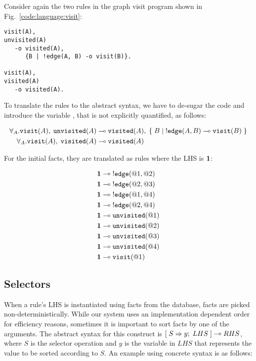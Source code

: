 Consider again the two rules in the graph visit program shown in
Fig.~\ref{code:language:visit}:

\nopagebreak

\begin{Verbatim}[fontsize=\codesize]
visit(A),
unvisited(A)
   -o visited(A),
      {B | !edge(A, B) -o visit(B)}.

visit(A),
visited(A)
   -o visited(A).
\end{Verbatim}

To translate the rules to the abstract syntax, we have to de-sugar the code and
introduce the variable , that is not explicitly quantified, as follows:

\nopagebreak

\begin{align}
\forall_A. \mathtt{visit}(A), \; \mathtt{unvisited}(A) \multimap & \;
\mathtt{visited}(A), \; \{ \; B \; | \; {!}\mathtt{edge}(A, B) \multimap \mathtt{visit}(B) \; \}\\
\forall_A. \mathtt{visit}(A), \; \mathtt{visited}(A) \multimap & \;
\mathtt{visited}(A)
\end{align}

For the initial facts, they are translated as rules where the LHS is $\mathbf{1}$:

\nopagebreak

\begin{align}
\mathbf{1} \multimap \; & {!} \mathtt{edge}(@1, @2) \\
\mathbf{1} \multimap \; & {!} \mathtt{edge}(@2, @3) \\
\mathbf{1} \multimap \; & {!} \mathtt{edge}(@1, @4) \\
\mathbf{1} \multimap \; & {!} \mathtt{edge}(@2, @4) \\
\mathbf{1} \multimap \; & \mathtt{unvisited}(@1)  \\
\mathbf{1} \multimap \; & \mathtt{unvisited}(@2) \\
\mathbf{1} \multimap \; & \mathtt{unvisited}(@3) \\
\mathbf{1} \multimap \; & \mathtt{unvisited}(@4) \\
\mathbf{1} \multimap \; & \mathtt{visit}(@1)
\end{align}

\subsection{Selectors}\label{section:language:selector}

When a rule's LHS is instantiated using facts from the database, facts are
picked non-deterministically. While our system uses an implementation dependent
order for efficiency reasons, sometimes it is important to sort facts by one of
the arguments. The abstract syntax for this construct is
$[\; S \Rightarrow y; \; LHS \;] \multimap RHS$, where $S$ is the selector operation and $y$ is the
variable in $LHS$ that represents the value to be sorted according to $S$. An
example using concrete syntax is as follows:

